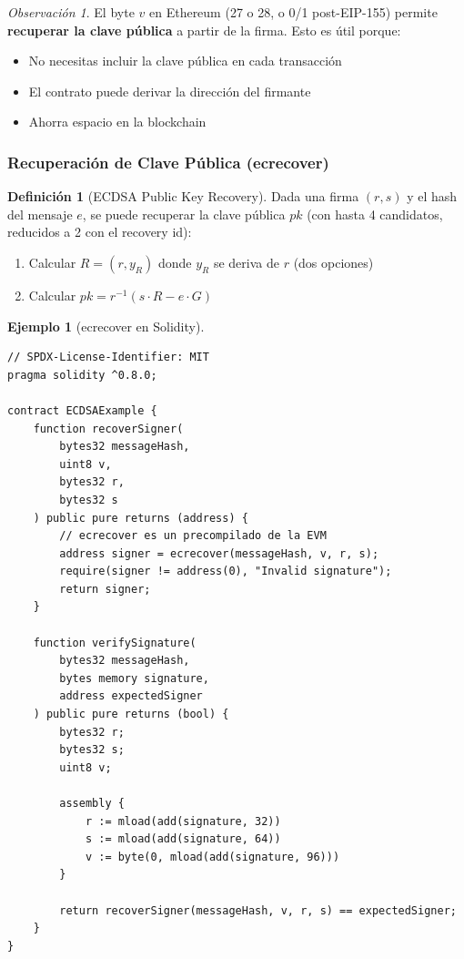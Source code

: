 \documentclass[11pt,a4paper,twoside,openright]{book}
\theoremstyle{definition}
\newtheorem{definition}{Definición}[chapter]
\newtheorem{example}{Ejemplo}[chapter]
\theoremstyle{plain}
\theoremstyle{remark}
\newtheorem{remark}{Observación}[chapter]
\begin{document}
\begin{remark}
El byte $v$ en Ethereum (27 o 28, o 0/1 post-EIP-155) permite \textbf{recuperar la clave pública} a partir de la firma. Esto es útil porque:
\begin{itemize}
    \item No necesitas incluir la clave pública en cada transacción
    \item El contrato puede derivar la dirección del firmante
    \item Ahorra espacio en la blockchain
\end{itemize}
\end{remark}

\subsubsection{Recuperación de Clave Pública (ecrecover)}

\begin{definition}[ECDSA Public Key Recovery]
Dada una firma $(r, s)$ y el hash del mensaje $e$, se puede recuperar la clave pública $pk$ (con hasta 4 candidatos, reducidos a 2 con el recovery id):

\begin{enumerate}
    \item Calcular $R = (r, y_R)$ donde $y_R$ se deriva de $r$ (dos opciones)
    \item Calcular $pk = r^{-1}(s \cdot R - e \cdot G)$
\end{enumerate}
\end{definition}

\begin{example}[ecrecover en Solidity]
\begin{verbatim}
// SPDX-License-Identifier: MIT
pragma solidity ^0.8.0;

contract ECDSAExample {
    function recoverSigner(
        bytes32 messageHash,
        uint8 v,
        bytes32 r,
        bytes32 s
    ) public pure returns (address) {
        // ecrecover es un precompilado de la EVM
        address signer = ecrecover(messageHash, v, r, s);
        require(signer != address(0), "Invalid signature");
        return signer;
    }
    
    function verifySignature(
        bytes32 messageHash,
        bytes memory signature,
        address expectedSigner
    ) public pure returns (bool) {
        bytes32 r;
        bytes32 s;
        uint8 v;
        
        assembly {
            r := mload(add(signature, 32))
            s := mload(add(signature, 64))
            v := byte(0, mload(add(signature, 96)))
        }
        
        return recoverSigner(messageHash, v, r, s) == expectedSigner;
    }
}
\end{verbatim}
\end{example}
\end{document}
